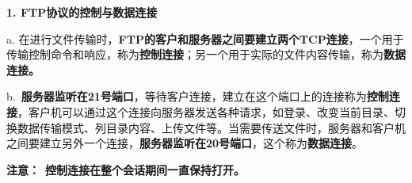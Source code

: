 {\textbf{1. FTP协议的控制与数据连接}}

a.
在进行文件传输时，{\textbf{FTP的客户和服务器之间要建立两个TCP连接}}，一个用于传输控制命令和响应，称为\textbf{控制连接}；另一个用于实际的文件内容传输，称为\textbf{数据连接。}

b.~\textbf{服务器监听在21号端口}，等待客户连接，建立在这个端口上的连接称为\textbf{控制连接}，客户机可以通过这个连接向服务器发送各种请求，如登录、改变当前目录、切换数据传输模式、列目录内容、上传文件等。当需要传送文件时，服务器和客户机之间要建立另外一个连接，{\textbf{服务器监听在20号端口}，}这个称为\textbf{数据连接}。

{\textbf{{注意：}}{~}\textbf{控制连接在整个会话期间一直保持打开。}}
